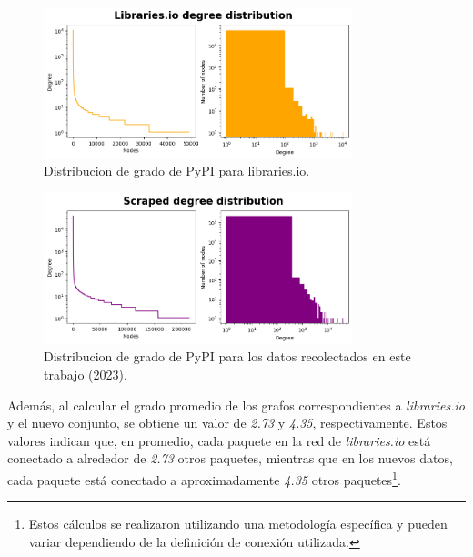 \begin{figure}[h!]
    \begin{center}
        \includegraphics[width=0.8\textwidth]{img/pypi/librariesio_degree_distribution.png}
        \caption{Distribucion de grado de PyPI para libraries.io.}
        \label{fig:pypi_librariesio_degree_distribution}
    \end{center}
\end{figure}

\begin{figure}[h!]
    \begin{center}
        \includegraphics[width=0.8\textwidth]{img/pypi/scraped_degree_distribution.png}
        \caption{Distribucion de grado de PyPI para los datos recolectados en este trabajo (2023).}
        \label{fig:pypi_scraped_degree_distribution}
    \end{center}
\end{figure}

Además, al calcular el grado promedio de los grafos correspondientes a \textit{libraries.io} y el nuevo
conjunto, se obtiene un valor de \textit{2.73} y \textit{4.35}, respectivamente. Estos valores indican
que, en promedio, cada paquete en la red de \textit{libraries.io} está conectado a alrededor de
\textit{2.73} otros paquetes, mientras que en los nuevos datos, cada paquete está conectado a
aproximadamente \textit{4.35} otros paquetes\footnote{Estos cálculos se realizaron utilizando una
    metodología específica y pueden variar dependiendo de la definición de conexión utilizada.}.

